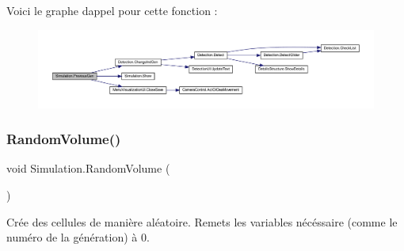Voici le graphe d\textquotesingle{}appel pour cette fonction \+:
\nopagebreak
\begin{figure}[H]
\begin{center}
\leavevmode
\includegraphics[width=350pt]{class_simulation_a2af29808f03940f4a8824c926f8c8cf9_cgraph}
\end{center}
\end{figure}
\mbox{\label{class_simulation_aff8ad1d9fe429a08bf0d42f52b08b71b}} 
\subsubsection{\texorpdfstring{Random\+Volume()}{RandomVolume()}}
{\footnotesize\ttfamily void Simulation.\+Random\+Volume (\begin{DoxyParamCaption}{ }\end{DoxyParamCaption})\hspace{0.3cm}{\ttfamily [inline]}}



Crée des cellules de manière aléatoire. Remets les variables nécéssaire (comme le numéro de la génération) à 0. 

